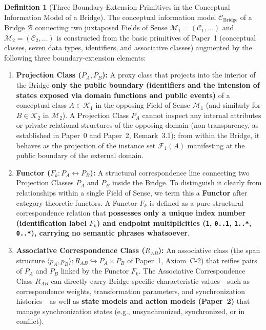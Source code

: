 \documentclass[11pt,a4paper]{article}
\theoremstyle{definition}
\newtheorem{definition}{Definition}[section]
\theoremstyle{plain}
\theoremstyle{remark}
\newcommand{\CBridge}{\mathcal{C}_{\mathrm{Bridge}}}
\begin{document}
\begin{definition}[Three Boundary-Extension Primitives in the Conceptual Information Model of a Bridge]\label{def:bridge-primitives}
The conceptual information model $\CBridge$ of a Bridge $\mathcal{B}$ connecting two juxtaposed Fields of Sense $\mathcal{M}_1 = (\mathcal{C}_1, \dots)$ and $\mathcal{M}_2 = (\mathcal{C}_2, \dots)$ is constructed from the basic primitives of Paper~1 (conceptual classes, seven data types, identifiers, and associative classes) augmented by the following three boundary-extension elements:

\begin{enumerate}
    \item \textbf{Projection Class ($P_A, P_B$):}
    A proxy class that projects into the interior of the Bridge \textbf{only the public boundary (identifiers and the intension of states exposed via domain functions and public events)} of a conceptual class $A \in \mathcal{K}_1$ in the opposing Field of Sense $\mathcal{M}_1$ (and similarly for $B \in \mathcal{K}_2$ in $\mathcal{M}_2$). A Projection Class $P_A$ cannot inspect any internal attributes or private relational structures of the opposing domain (non-transparency, as established in Paper~0 and Paper~2, Remark~3.1); from within the Bridge, it behaves as the projection of the instance set $\mathcal{F}_1(A)$ manifesting at the public boundary of the external domain.
    \item \textbf{Functor ($F_k : P_A \leftrightarrow P_B$):}
    A structural correspondence line connecting two Projection Classes $P_A$ and $P_B$ inside the Bridge. To distinguish it clearly from relationships within a single Field of Sense, we term this a \textbf{Functor} after category-theoretic functors. A Functor $F_k$ is defined as a pure structural correspondence relation that \textbf{possesses only a unique index number (identification label $F_k$) and endpoint multiplicities (\texttt{1}, \texttt{0..1}, \texttt{1..*}, \texttt{0..*}), carrying no semantic phrases whatsoever}.
    \item \textbf{Associative Correspondence Class ($R_{AB}$):}
    An associative class (the span structure $\langle p_A, p_B \rangle : R_{AB} \hookrightarrow P_A \times P_B$ of Paper~1, Axiom~C-2) that reifies pairs of $P_A$ and $P_B$ linked by the Functor $F_k$. The Associative Correspondence Class $R_{AB}$ can directly carry Bridge-specific characteristic values---such as correspondence weights, transformation parameters, and synchronization histories---as well as \textbf{state models and action models (Paper~2)} that manage synchronization states (e.g., unsynchronized, synchronized, or in conflict).
\end{enumerate}
\end{definition}
\end{document}
